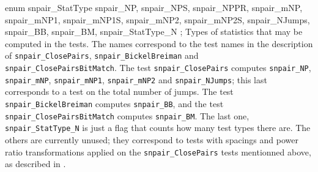 enum snpair_StatType {
   snpair_NP,
   snpair_NPS,
   snpair_NPPR,
   snpair_mNP,
   snpair_mNP1,
   snpair_mNP1S,
   snpair_mNP2,
   snpair_mNP2S,
   snpair_NJumps,
   snpair_BB,
   snpair_BM,
   snpair_StatType_N
};
\endcode
 \tab  Types of statistics that may be computed in the tests.
  The names  correspond to the test names in the  description of
  {\tt snpair\_ClosePairs}, {\tt snpair\_BickelBreiman} and
  {\tt snpair\_ClosePairs\-Bit\-Match}.
  The test {\tt snpair\_ClosePairs} computes {\tt snpair\_NP}, {\tt snpair\_mNP},
  {\tt snpair\_mNP1}, {\tt snpair\_mNP2} and {\tt snpair\_NJumps}; this last
  corresponds to a test on the total number of jumps.
  The test {\tt snpair\_BickelBreiman} computes {\tt snpair\_BB}, and
  the test {\tt snpair\_Clo\-se\-Pairs\-Bit\-Match} computes {\tt snpair\_BM}.
  The last one, {\tt snpair\_StatType\_N} is just a flag that counts how
  many test types there are. The others are currently unused; they correspond
  to tests with spacings and power ratio transformations applied on the
  {\tt snpair\_ClosePairs} tests mentionned  above, as described in \cite{rLEC00c}.
 \endtab



\code




